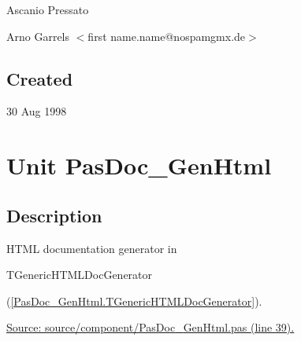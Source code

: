\documentclass{report}
\begin{document}
\par
Ascanio Pressato

\par
Arno Garrels {$<$}first name.name@nospamgmx.de{$>$}

\section{Created}
\par
30 Aug 1998


\chapter{Unit PasDoc{\_}GenHtml}
\label{PasDoc_GenHtml}
\section{Description}
HTML documentation generator in \begin{ttfamily}TGenericHTMLDocGenerator\end{ttfamily}(\ref{PasDoc_GenHtml.TGenericHTMLDocGenerator}).\hfill\vspace*{1ex}

              \par
\href{https://github.com/pasdoc/pasdoc/blob/master/source/component/PasDoc_GenHtml.pas#L39}{Source: source/component/PasDoc{\_}GenHtml.pas (line 39).}
\end{document}
